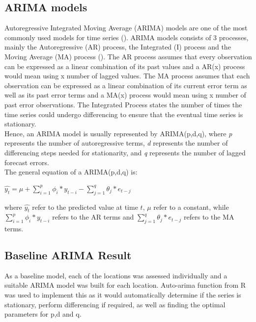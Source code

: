 \documentclass[nonblindrev,msom]{informs3} %
\begin{document}
\subsection{ARIMA models}
Autoregressive Integrated Moving Average (ARIMA) models are one of the most commonly used models for time series (\cite{Asha2016}). ARIMA models consists of 3 processes, mainly the Autoregressive (AR) process, the Integrated (I) process and the Moving Average (MA) process (\cite{Jamal2018}). The AR process assumes that every observation can be expressed as a linear combination of its past values and a AR(x) process would mean using x number of lagged values. The MA process assumes that each observation can be expressed as a linear combination of its current error term as well as its past error terms and a MA(x) process would mean using x number of past error observations. The Integrated Process states the number of times the time series could undergo differencing to ensure that the eventual time series is stationary. \\

\noindent Hence, an ARIMA model is usually represented by ARIMA(p,d,q), where \textit{p} represents the number of autoregressive terms, \textit{d} represents the number of differencing steps needed for stationarity, and \textit{q} represents the number of lagged forecast errors. \\

\noindent The general equation of a ARIMA(p,d,q) is: \\

\begin{center}
$\hat{y_t} = \mu + \sum_{i=1}^{p} \phi_i * y_{t-i} - \sum_{j=1}^{q} \theta_j * e_{t-j}$
\end{center}

\noindent where $\hat{y_t}$ refer to the predicted value at time $t$, $\mu$ refer to a constant, while $\sum_{i=1}^{p} \phi_i * y_{t-i}$ refers to the AR terms and $\sum_{j=1}^{q} \theta_j * e_{t-j}$ refers to the MA terms.

\newpage
\subsection{Baseline ARIMA Result}
As a baseline model, each of the locations was assessed individually and a suitable ARIMA model was built for each location. Auto-arima function from R was used to implement this as it would automatically determine if the series is stationary, perform differencing if required, as well as finding the optimal parameters for p,d and q. \\
\end{document}
